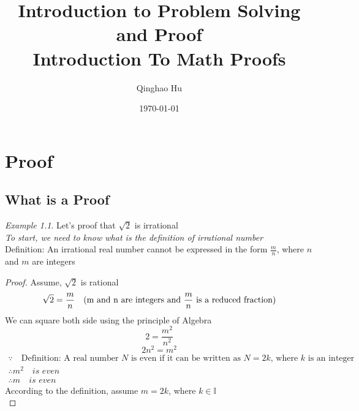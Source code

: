\documentclass[11pt]{report}
\title{\textbf{Introduction to Problem Solving and Proof} \\ \large Introduction To Math Proofs}
\author{Qinghao Hu}
\date{\today}
\theoremstyle{remark}
\newtheorem*{example}{Example}
\begin{document}
\maketitle
\newpage
\tableofcontents
\newpage

\chapter{Proof}
\section{What is a Proof}
\begin{example}
	Let's proof that $\sqrt{2}$ is irrational\\
	\indent\textit{To start, we need to know what is the definition of irrational number} \\
	\indent Definition: An irrational real number cannot be expressed in the form $\frac{m}{n}$, where $n$ and $m$ are integers \\
	\begin{proof}
		Assume, $\sqrt{2}$ is rational \\
		\begin{equation}
			\sqrt{2} = {m \over n} \quad \text{(m and n are integers and $\frac{m}{n}$ is a reduced fraction)}
		\end{equation}
		We can square both side using the principle of Algebra \\
		\begin{equation}
			2 = \frac{m^2}{n^2} 
		\end{equation}
		\begin{equation}
			2n^2 = m^2
		\end{equation}
		\begin{gather}
		\because \quad \text{Definition: A real number $N$ is even if it can be written as $N = 2k$, where $k$ is an integer}\\
		\therefore m^2 \quad\textit{is even} \\
		\therefore m \quad\textit{is even}
		\end{gather}
		According to the definition, assume $m = 2k$, where $k \in \mathbb{I}$ \\

\end{proof}
\end{example}
\end{document}
